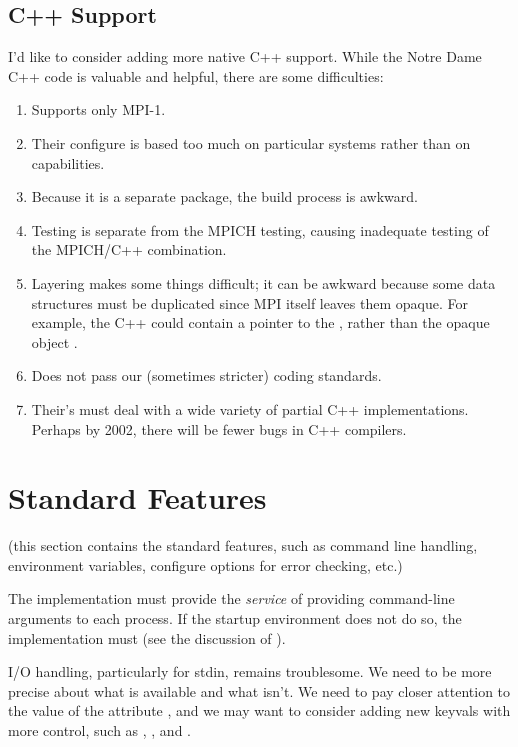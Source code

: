 \documentclass{article}
\begin{document}
\subsection{C++ Support}
\label{sec:c++}
I'd like to consider adding more native C++ support.  While the Notre
Dame C++ code is valuable and helpful, there are some difficulties:
\begin{enumerate}
\item Supports only MPI-1.

\item Their configure is based too much on particular systems rather than on
capabilities. 

\item Because it is a separate package, the build process is awkward.

\item Testing is separate from the MPICH testing, causing inadequate
testing of the MPICH/C++ combination.

\item Layering makes some things difficult; it can be awkward because
some data structures must be duplicated since MPI itself leaves them
opaque.  For example, the C++  could contain a pointer to the
, rather than the opaque object .

\item Does not pass our (sometimes stricter) coding standards.

\item Their's must deal with a wide variety of partial C++
implementations.  Perhaps by 2002, there will be fewer bugs in C++ compilers.
\end{enumerate}

\section{Standard Features}
\label{sec:standard-features}
(this section contains the standard features, such as command line
handling, environment variables, configure options for error checking,
etc.)

The implementation must provide the \emph{service} of providing
command-line arguments to each process.  If the startup environment
does not do so, the implementation must (see the discussion of
).  

I/O handling, particularly for stdin, remains troublesome.  We need to
be more precise about what is available and what isn't.  We need to
pay closer attention to the value of the attribute ,
and we may want to consider adding new keyvals with more control, such
as , , and
. 
\end{document}
